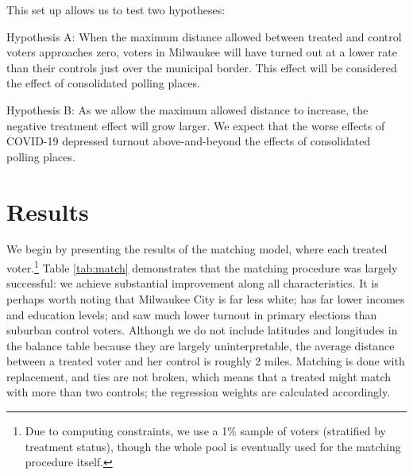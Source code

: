 \documentclass[
  12pt,
]{article}
\begin{document}
This set up allows us to test two hypotheses:

Hypothesis A: When the maximum distance allowed between treated and control voters approaches zero, voters in Milwaukee will have turned out at a lower rate than their controls just over the municipal border. This effect will be considered the effect of consolidated polling places.

Hypothesis B: As we allow the maximum allowed distance to increase, the negative treatment effect will grow larger. We expect that the worse effects of COVID-19 depressed turnout above-and-beyond the effects of consolidated polling places.

\hypertarget{results}{%
\section*{Results}\label{results}}

We begin by presenting the results of the matching model, where each treated voter.\footnote{Due to computing constraints, we use a 1\% sample of voters (stratified by treatment status), though the whole pool is eventually used for the matching procedure itself.} Table \ref{tab:match} demonstrates that the matching procedure was largely successful: we achieve substantial improvement along all characteristics. It is perhaps worth noting that Milwaukee City is far less white; has far lower incomes and education levels; and saw much lower turnout in primary elections than suburban control voters. Although we do not include latitudes and longitudes in the balance table because they are largely uninterpretable, the average distance between a treated voter and her control is roughly 2 miles. Matching is done with replacement, and ties are not broken, which means that a treated might match with more than two controls; the regression weights are calculated accordingly.
\end{document}
